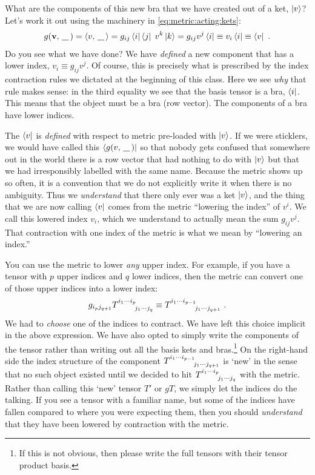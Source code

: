 \documentclass[12pt]{article}
\begin{document}
What are the components of this new bra that we have created out of a ket, $\left|v\right\rangle$? Let's work it out using the machinery in \eqref{eq:metric:acting:kets}:
\begin{align}
    g(\vec{v},\smallslot) = \la v, \smallslot \ra = 
    g_{ij}\bra{i}\bra{j}\; v^k\ket{k} = 
    g_{ij}v^j \bra{i}
    \equiv v_i \bra{i} 
    \equiv \bra{v}\ .
\end{align}
Do you see what we have done? We have \emph{defined} a new component that has a lower index, $v_i \equiv g_{ij}v^j$. Of course, this is precisely what is prescribed by the index contraction rules we dictated at the beginning of this class. Here we see \emph{why} that rule makes sense: in the third equality we see that the basis tensor is a bra, $\left\langle i\right|$. This means that the object must be a bra (row vector). The components of a bra have lower indices. 
\begin{bigidea}
The $\left\langle v\right|$ is \emph{defined} with respect to metric pre-loaded with $\left|v\right\rangle$. If we were sticklers, we would have called this $\bra{g(v,\smallslot)}$ so that nobody gets confused that somewhere out in the world there is a row vector that had nothing to do with $\left|v\right\rangle$ but that we had irresponsibly labelled with the same name. Because the metric shows up so often, it is a convention that we do not explicitly write it when there is no ambiguity. Thus we \emph{understand} that there only ever was a ket $\left|v\right\rangle$, and the thing that we are now calling $\left\langle v\right|$ comes from the metric ``lowering the index'' of $v^i$. We call this lowered index $v_i$, which we understand to actually mean the sum $g_{ij}v^j$. That contraction with one index of the metric is what we mean by ``lowering an index.''
\end{bigidea}

You can use the metric to lower \emph{any} upper index. For example, if you have a tensor with $p$ upper indices and $q$ lower indices, then the metric can convert one of those upper indices into a lower index:
\begin{align}
    g_{i_pj_{q+1}} T\aij{i_1\cdots i_p}{j_1\cdots j_q} \equiv T\aij{i_1\cdots i_{p-1}}{j_1\cdots j_{q+1}} \ .
\end{align}
We had to \emph{choose} one of the indices to contract. We have left this choice implicit in the above expression. We have also opted to simply write the components of the tensor rather than writing out all the basis kets and bras.\footnote{If this is not obvious, then please write the full tensors with their tensor product basis.} On the right-hand side the index structure of the component $T\aij{i_1\cdots i_{p-1}}{j_1\cdots j_{q+1}}$ is `new' in the sense that no such object existed until we decided to hit $T\aij{i_1\cdots i_p}{j_1\cdots j_q}$ with the metric. Rather than calling this `new' tensor $T'$ or $gT$, we simply let the indices do the talking. If you see a tensor with a familiar name, but some of the indices have fallen compared to where you were expecting them, then you should \emph{understand} that they have been lowered by contraction with the metric. 
\end{document}
